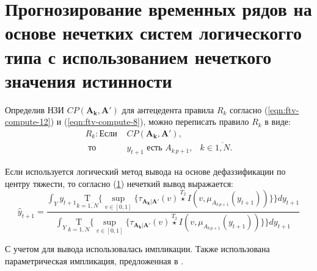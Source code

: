 %	


\section{Прогнозирование временных рядов на основе нечетких систем логическогго типа с использованием нечеткого значения истинности}

Определив НЗИ $CP(\mathbf{A_{k}, \mathbf{A'}})$ для антецедента правила $R_k$ согласно (\ref{eqn:ftv-compute-12}) и (\ref{eqn:ftv-compute-8}), можно переписать правило $R_k$ в виде:
\begin{align*}
	R_k: \textrm{Если }&CP(\mathbf{A_{k}, \mathbf{A'}}),&\\
	\textrm{ то }&y_{t+1}\textrm{ есть }A_{k\,p+1},&k\in\overline{1,N}.
\end{align*}


Если используется логический метод вывода на основе дефаззификации по центру тяжести, то согласно (\ref{}) нечеткий вывод выражается:
\begin{equation}
\hat{y}_{t+1} = \frac{\int_Y y_{t+1} \underset{k=\overline{1,N}}{\textrm{T}}\Biggl\{\sup_{v \in [0,1]}\biggl\{\tau_{\mathbf{A_k}|\mathbf{A'}}(v)\overset{T_2}{\star} I(v, \mu_{A_{k\,p+1}}(y_{t+1}))\biggr\}\Biggr\} dy_{t+1}}{\int_Y \underset{k=\overline{1,N}}{\textrm{T}}\Biggl\{\sup_{v \in [0,1]}\biggl\{\tau_{\mathbf{A_k}|\mathbf{A'}}(v)\overset{T_2}{\star} I(v, \mu_{A_{k\,p+1}}(y_{t+1}))\biggr\}\Biggr\} dy_{t+1}}
\end{equation}

С учетом \cite{} для вывода использовалась импликации. Также использована параметрическая импликация, предложенная в .

